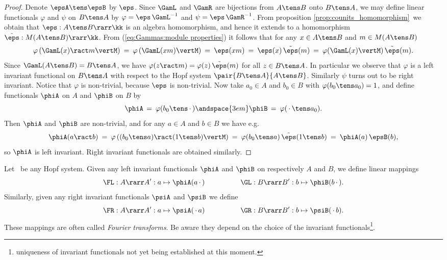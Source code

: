 \begin{proof}
Denote $\epsA \tens \epsB$ by $\eps$.
Since $\GamL$ and $\GamR$ are bijections from $A\tens B$ onto $B \tens A$,
we may define linear functionals $\varphi$ and $\psi$ on $B \tens A$ by
$\varphi = \eps \, \GamL^{-1}$ and $\psi = \eps \, \GamR^{-1}$.
From proposition \ref{prop:counits_homomorphism}\ we obtain that $\eps : A\tens B \rarr \kk$
is an algebra homomorphism, and hence it extends to a homomorphism
$\tilde{\eps} : M(A\tens B) \rarr \kk$.
From (\ref{eq:Gammas:module properties}) it follows that for any $x \in A\tens B$
and $m \in M(A\tens B)$
$$  \varphi \left( \GamL(x) \ract m \vertM\right)
       \:=\:  \varphi \left( \GamL(xm) \vertM\right)
       \:=\:  \eps(xm)
       \:=\:  \eps(x)\, \tilde{\eps}(m)
       \:=\:  \varphi\! \left( \GamL(x) \vertM\right) \tilde{\eps}(m).  $$
Since $\GamL(A\tens B)= B \tens A$, we have
$\varphi(z \ract m) = \varphi(z) \, \tilde{\eps}(m)$ for all $z\in B\tens A$.
In particular we observe that $\varphi$ is a left invariant functional on $B \tens A$
with respect to the Hopf system $\pair{B \tens A}{A\tens B}$.
Similarly $\psi$ turns out to be right invariant.
Notice that $\varphi$ is non-trivial, because $\eps$ is non-trivial.
Now take $a_0 \in A$ and $b_0\in B$ with $\varphi(b_0 \tens a_0) = 1$,
and define functionals $\phiA$ on $A$ and $\phiB$ on $B$ by
$$ \phiA \,=\: \varphi(b_0 \tens \,\cdot\,)   \andspace{3em}
   \phiB \,=\: \varphi(\,\cdot\, \tens a_0). $$
Then $\phiA$ and $\phiB$ are non-trivial,
and for any $a\in A$ and $b\in B$ we have e.g.
$$ \phiA(a \ract b)
      \:=\: \varphi\left((b_0 \tens a) \ract (1 \tens b) \vertM\right)
      \:=\: \varphi(b_0 \tens a)\, \tilde{\eps}(1 \tens b)
      \:=\: \phiA(a) \, \epsB(b),  $$
so $\phiA$ is left invariant. Right invariant functionals are obtained similarly.
\end{proof}



\begin{defn_sec} \label{def:mhs:Fourier_transforms}
Let \pairAB\ be any Hopf system. Given any left invariant functionals
$\phiA$ and $\phiB$ on respectively $A$ and $B$, we define linear mappings
$$  \FL : A \rarr A' :  a \mapsto \phiA(a\, \cdot \,)
        \hspace{5em}
    \GL : B \rarr B' :  b \mapsto \phiB(b\, \cdot \,). $$
Similarly, given any right invariant functionals $\psiA$ and $\psiB$ we define
$$  \FR : A \rarr A' :  a \mapsto \psiA(\, \cdot \, a)
        \hspace{5em}
    \GR : B \rarr B' :  b \mapsto \psiB(\, \cdot \, b). $$
These mappings are often called {\em Fourier transforms}\@.
Be aware they depend on the choice of the invariant
functionals\footnote{uniqueness of invariant functionals not yet being
established at this moment.}.
\end{defn_sec}



